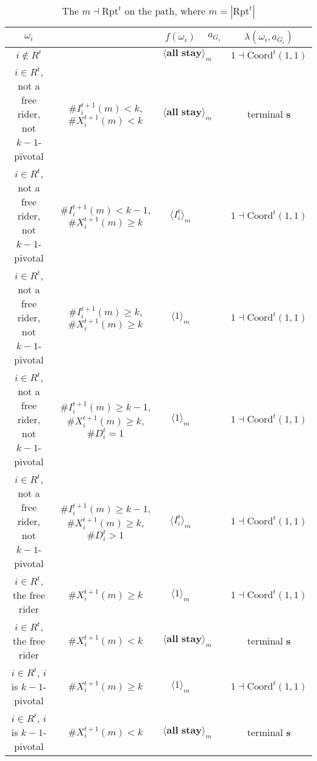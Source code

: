 \documentclass[12pt,letter]{article}
\newcommand{\Kappa}{\mathrm{Coord}}
\newcommand{\Omicron}{\mathrm{Rpt}}
\theoremstyle{definition}
\theoremstyle{remark}
\theoremstyle{claim}
\begin{document}
\begin{landscape}
\begin{table}[!htbp]
\caption{The $m\dashv\Omicron^t$ on the path, where $m=|\Omicron^t|$}
\label{table:eqm_path_ot2}
\begin{center}
\begin{tabular}{c c | c | c | c}
$\omega_i$ 	 & 	   &	$f(\omega_i)$  &	$a_{G_i}$ & $\lambda(\omega_i,a_{G_i})$ \\
\hline
\hline
$i\notin R^t$  	& 								& $\langle \textbf{all stay} \rangle_m$		&  			& $1\dashv \Kappa^t(1,1)$ \\
$i\in R^t$, not a free rider, not $k-1$-pivotal		 	&  $\#I^{t+1}_i(m)< k$, $\#X^{t+1}_i(m)<k$			&  $\langle \textbf{all stay} \rangle_m$	& 	& terminal \textbf{s} \\
$i\in R^t$, not a free rider, not $k-1$-pivotal	  	& $\#I^{t+1}_i(m)<k-1$, $\#X^{t+1}_i(m)\geq k$		    & $\langle I^t_i \rangle_m$ 		&    			& $1\dashv \Kappa^t(1,1)$ \\
$i\in R^t$, not a free rider, not $k-1$-pivotal	 	&  $\#I^{t+1}_i(m)\geq k$, $\#X^{t+1}_i(m)\geq k$	& $\langle 1 \rangle_m$ 	& 	& $1\dashv \Kappa^t(1,1)$ \\
$i\in R^t$, not a free rider, not $k-1$-pivotal	 	&  $\#I^{t+1}_i(m)\geq k-1$, $\#X^{t+1}_i(m)\geq k$, $\#D^t_i=1$	& $\langle 1 \rangle_m$ 	& 	& $1\dashv \Kappa^t(1,1)$ \\
$i\in R^t$, not a free rider, not $k-1$-pivotal	 	&  $\#I^{t+1}_i(m)\geq k-1$, $\#X^{t+1}_i(m)\geq k$, $\#D^t_i>1$	& $\langle I^t_i \rangle_m$ 	& 	& $1\dashv \Kappa^t(1,1)$ \\
$i\in R^t$, the free rider  	&  $\#X^{t+1}_i(m)\geq k$ & $\langle 1 \rangle_m$ 		& 				  & $1\dashv \Kappa^t(1,1)$ \\
$i\in R^t$, the free rider  	&  		$\#X^{t+1}_i(m)<k$					&  $\langle \textbf{all stay} \rangle_m$		& 										  & terminal \textbf{s} \\
$i\in R^t$, $i$ is $k-1$-pivotal  	&  $\#X^{t+1}_i(m)\geq k$ & $\langle 1 \rangle_m$ 	& 											 & $1\dashv \Kappa^t(1,1)$ \\
$i\in R^t$, $i$ is $k-1$-pivotal  	&  	$\#X^{t+1}_i(m)<k$		&  $\langle \textbf{all stay} \rangle_m$	& 											 & terminal \textbf{s} \\
\hline
\end{tabular}
\end{center}
\end{table}


\end{landscape}
\end{document}
